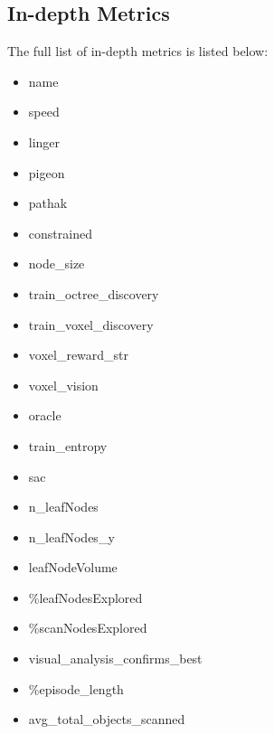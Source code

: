         


\newpage

\subsection{In-depth Metrics}\label{appendix:indepth-metrics}
The full list of in-depth metrics is listed below:
\begin{itemize}
    \item name
    \item speed
    \item linger
    \item pigeon
    \item pathak
    \item constrained
    \item node_size
    \item train_octree_discovery
    \item train_voxel_discovery
    \item voxel_reward_str
    \item voxel_vision
    \item oracle
    \item train_entropy
    \item sac
    \item n_leafNodes
    \item n_leafNodes_y
    \item leafNodeVolume
    \item \%leafNodesExplored
    \item \%scanNodesExplored
    \item visual_analysis_confirms_best
    \item \%episode_length
    \item avg_total_objects_scanned
\end{itemize}

